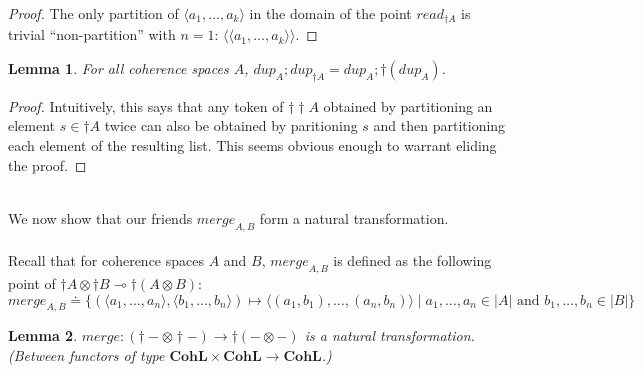 \documentclass{article}
\newtheorem{lemma}{Lemma}
\newcommand{\mbf}{\mathbf}
\begin{document}
\begin{proof}
The only partition of $\langle a_1, \ldots, a_k \rangle$ in the domain of the point $\mathit{read}_{\dagger A}$ is trivial ``non-partition'' with $n=1$: $\langle \langle a_1, \ldots, a_k \rangle \rangle$. 
\end{proof}

\begin{lemma}
For all coherence spaces $A$, $\mathit{dup}_A;\mathit{dup}_{\dagger A} = \mathit{dup}_A;\dagger(\mathit{dup}_A)$.
\end{lemma}

\begin{proof}
Intuitively, this says that any token of $\dagger \dagger A$ obtained by partitioning an element $s \in \dagger A$
twice can also be obtained by paritioning $s$ and then partitioning each element of the resulting list. This 
seems obvious enough to warrant eliding the proof.
\end{proof}~\\
We now show that our friends $\mathit{merge}_{A,B}$ form a natural transformation.\\~\\
Recall that for coherence spaces $A$ and $B$, $\mathit{merge}_{A,B}$ is defined as the following point of $\dagger A \otimes \dagger B \multimap \dagger(A \otimes B)$:
$$\mathit{merge}_{A,B} \doteq \{ (\langle a_1, \ldots, a_n \rangle, \langle b_1, \ldots, b_n \rangle) \mapsto 
 \langle (a_1, b_1),\ldots,(a_n,b_n) \rangle \mid a_1, \ldots, a_n \in |A| \text{ and } b_1, \ldots, b_n \in |B|  \}$$

\begin{lemma}
$\mathit{merge} : (\dagger - \otimes \dagger -) \to \dagger(- \otimes -)$ is a natural transformation. (Between functors of type $\mbf{CohL} \times \mbf{CohL} \to \mbf{CohL}$.)
\end{lemma}
\end{document}
